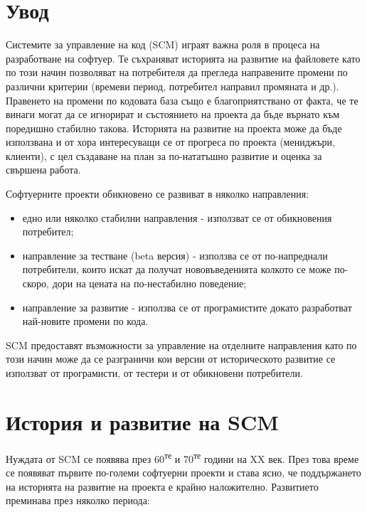 \documentclass[a4paper]{article}
\begin{document}
% 


\section{Увод}
Системите за управление на код (SCM) играят важна роля в процеса на
разработване на софтуер. Те съхраняват историята на развитие на файловете като
по този начин позволяват на потребителя да прегледа направените промени по
различни критерии (времеви период, потребител направил промяната и др.).
Правенето на промени по кодовата база също е благоприятствано от факта, че
те винаги могат да се игнорират и състоянието на проекта да бъде върнато към
поредишно стабилно такова. Историята на развитие на проекта може да бъде
използвана и от хора интересуващи се от прогреса по проекта (мениджъри,
клиенти), с цел създаване на план за по-нататъшно развитие и оценка за свършена
работа.


Софтуерните проекти обикновено се развиват в няколко направления:
\begin{itemize}
  \item едно или няколко стабилни направления - използват се от обикновения
  потребител;
  \item направление за тестване (beta версия) - използва се от по-напреднали
  потребители, които искат да получат нововъведенията колкото се може по-скоро,
  дори на цената на по-нестабилно поведение;
  \item направление за развитие - използва се от програмистите докато
  разработват най-новите промени по кода.
\end{itemize}


SCM предоставят възможности за управление на отделните направления като по
този начин може да се разграничи кои версии от историческото развитие се
използват от програмисти, от тестери и от обикновени потребители.

\section{История и развитие на SCM}
Нуждата от SCM се появява през 60\textsuperscript{те} и
70\textsuperscript{те} години на XX век. През
това време се появяват първите по-големи софтуерни проекти и става ясно, че
поддържането на историята на развитие на проекта е крайно наложително.
Развитието преминава през няколко периода:
\end{document}
